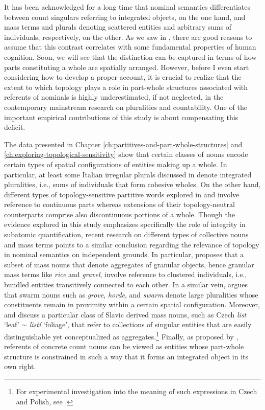 It has been acknowledged for a long time that nominal semantics differentiates between count singulars referring to integrated objects, on the one hand, and mass terms and plurals denoting scattered entities and arbitrary sums of individuals, respectively, on the other. As we saw in , there are good reasons to assume that this contrast correlates with some fundamental properties of human cognition. Soon, we will see that the distinction can be captured in terms of how parts constituting a whole are spatially arranged. However, before I even start considering how to develop a proper account, it is crucial to realize that the extent to which topology plays a role in part-whole structures associated with referents of nominals is highly underestimated, if not neglected, in the contemporary mainstream research on pluralities and countability. One of the important empirical contributions of this study is about compensating this deficit. 

The data presented in Chapter \ref{ch:partitives-and-part-whole-structures} and \ref{ch:exploring-topological-sensitivity} show that certain classes of nouns encode certain types of spatial configurations of entities making up a whole. In particular, at least some Italian irregular plurals discussed in  denote integrated pluralities, i.e., sums of individuals that form cohesive wholes. On the other hand, different types of topology-sensitive partitive words explored in  and  involve reference to continuous parts whereas extensions of their topology-neutral counterparts comprise also discontinuous portions of a whole. Though the evidence explored in this study emphasizes specifically the role of integrity in subatomic quantification, recent research on different types of collective nouns and mass terms points to a similar conclusion regarding the relevance of topology in nominal semantics on independent grounds. In particular, \citet{grimm2012number} proposes that a subset of mass nouns that denote aggregates of granular objects, hence granular mass terms like \textit{rice} and \textit{gravel}, involve reference to clustered individuals, i.e., bundled entities transitively connected to each other. In a similar vein, \citet{henderson2017swarms} argues that swarm nouns such as \textit{grove}, \textit{horde}, and \textit{swarm} denote large pluralities whose constituents remain in proximity within a certain spatial configuration. Moreover, \citet{grimm_docekal-toappear-counting} and \citet{wagiel-toappear-slavic} discuss a particular class of Slavic derived mass nouns, such as Czech \textit{list} `leaf' $\sim$ \textit{listí} `foliage', that refer to collections of singular entities that are easily distinguishable yet conceptualized as aggregates.\footnote{For experimental investigation into the meaning of such expressions in Czech and Polish, see \citet{docekal_wagiel2018decomposing}.} Finally, as proposed by \citet{grimm2012number}, referents of concrete count nouns can be viewed as entities whose part-whole structure is constrained in such a way that it forms an integrated object in its own right.

